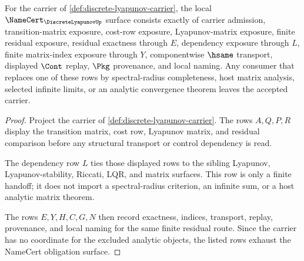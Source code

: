 \begin{theorem}
\label{thm:discrete-lyapunov-namecert-obligations}
For the carrier of \autoref{def:discrete-lyapunov-carrier}, the local $\NameCert_{\DiscreteLyapunovUp}$ surface consists exactly of carrier admission, transition-matrix exposure, cost-row exposure, Lyapunov-matrix exposure, finite residual exposure, residual exactness through $E$, dependency exposure through $L$, finite matrix-index exposure through $Y$, componentwise $\hsame$ transport, displayed $\Cont$ replay, $\Pkg$ provenance, and local naming. Any consumer that replaces one of these rows by spectral-radius completeness, host matrix analysis, selected infinite limits, or an analytic convergence theorem leaves the accepted carrier.
\end{theorem}
\begin{proof}
Project the carrier of \autoref{def:discrete-lyapunov-carrier}. The rows $A,Q,P,R$ display the transition matrix, cost row, Lyapunov matrix, and residual comparison before any structural transport or control dependency is read.

The dependency row $L$ ties those displayed rows to the sibling Lyapunov, Lyapunov-stability, Riccati, LQR, and matrix surfaces. This row is only a finite handoff; it does not import a spectral-radius criterion, an infinite sum, or a host analytic matrix theorem.

The rows $E,Y,H,C,G,N$ then record exactness, indices, transport, replay, provenance, and local naming for the same finite residual route. Since the carrier has no coordinate for the excluded analytic objects, the listed rows exhaust the NameCert obligation surface.
\end{proof}

